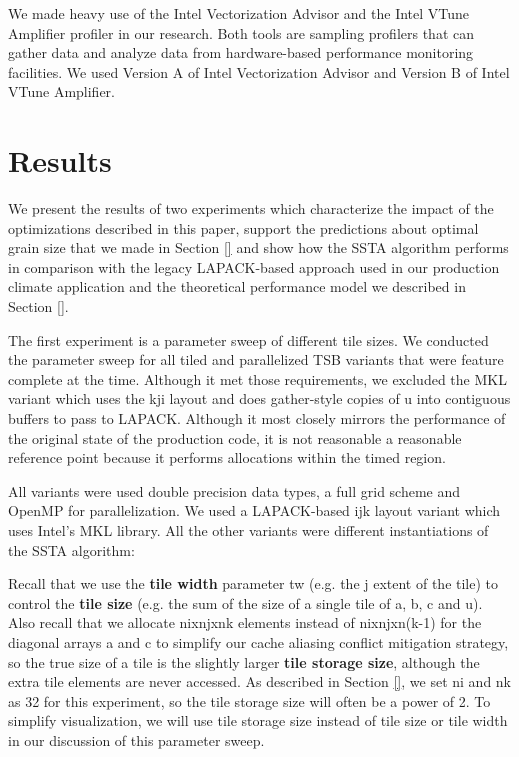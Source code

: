 \documentclass{sig-alternate-05-2015}
\begin{document}
We made heavy use of the Intel Vectorization Advisor and the Intel VTune
Amplifier profiler in our research. Both tools are sampling profilers that can
gather data and analyze data from hardware-based performance monitoring
facilities. We used Version A of Intel Vectorization Advisor and Version B of
Intel VTune Amplifier.

\section{Results}
\label{sec:results}

We present the results of two experiments which characterize the impact of the
optimizations described in this paper, support the predictions about optimal
grain size that we made in Section \ref{} and show how the SSTA algorithm
performs in comparison with the legacy LAPACK-based approach used in our
production climate application and the theoretical performance model we
described in Section \ref{}.

The first experiment is a parameter sweep of different tile sizes. We conducted
the parameter sweep for all tiled and parallelized TSB variants that were
feature complete at the time. Although it met those requirements, we excluded
the MKL variant which uses the kji layout and does gather-style copies of u
into contiguous buffers to pass to LAPACK. Although it most closely mirrors the
performance of the original state of the production code, it is not reasonable
a reasonable reference point because it performs allocations within the timed 
region.

All variants were used double precision data types, a full grid scheme and
OpenMP for parallelization. We used a LAPACK-based ijk layout variant which
uses Intel's MKL library. All the other variants were different instantiations
of the SSTA algorithm:


Recall that we use the \textbf{tile width} parameter tw (e.g. the j extent of
the tile) to control the \textbf{tile size} (e.g. the sum of the size of a
single tile of a, b, c and u). Also recall that we allocate nixnjxnk elements
instead of nixnjxn(k-1) for the diagonal arrays a and c to simplify our cache
aliasing conflict mitigation strategy, so the true size of a tile is the
slightly larger \textbf{tile storage size}, although the extra tile elements
are never accessed. As described in Section \ref{}, we set ni and nk as 32 for
this experiment, so the tile storage size will often be a power of 2. To
simplify visualization, we will use tile storage size instead of tile size or
tile width in our discussion of this parameter sweep.
\end{document}
